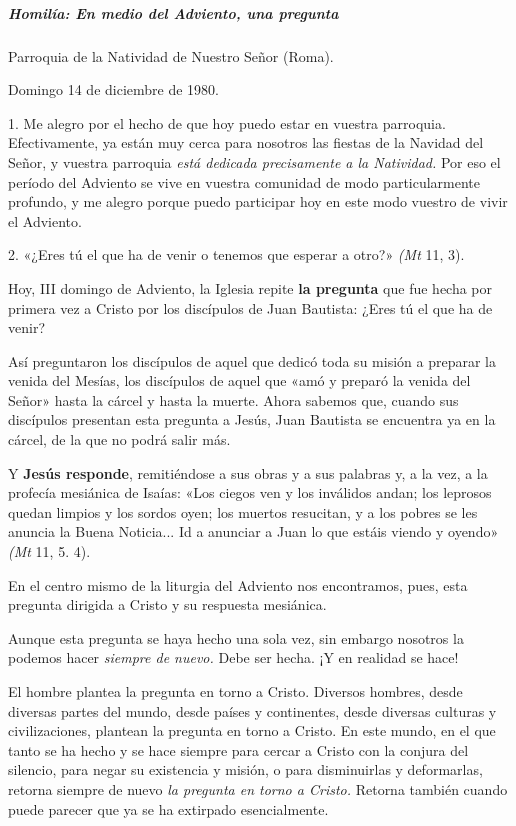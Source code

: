 \documentclass[]{article}
\let\oldsubparagraph\subparagraph
\renewcommand{\subparagraph}[1]{\oldsubparagraph{#1}\mbox{}}
\begin{document}
\subparagraph{Homilía: En medio del Adviento, una
pregunta}\label{homiluxeda-en-medio-del-adviento-una-pregunta}

Parroquia de la Natividad de Nuestro Señor (Roma).

Domingo 14 de diciembre de 1980.

1. Me alegro por el hecho de que hoy puedo estar en vuestra parroquia.
Efectivamente, ya están muy cerca para nosotros las fiestas de la
Navidad del Señor, y vuestra parroquia \emph{está dedicada precisamente
a la Natividad.} Por eso el período del Adviento se vive en vuestra
comunidad de modo particularmente profundo, y me alegro porque puedo
participar hoy en este modo vuestro de vivir el Adviento.

2. «¿Eres tú el que ha de venir o tenemos que esperar a otro?»
\emph{(Mt} 11, 3).

Hoy, III domingo de Adviento, la Iglesia repite \textbf{la pregunta} que
fue hecha por primera vez a Cristo por los discípulos de Juan Bautista:
¿Eres tú el que ha de venir?

Así preguntaron los discípulos de aquel que dedicó toda su misión a
preparar la venida del Mesías, los discípulos de aquel que «amó y
preparó la venida del Señor» hasta la cárcel y hasta la muerte. Ahora
sabemos que, cuando sus discípulos presentan esta pregunta a Jesús, Juan
Bautista se encuentra ya en la cárcel, de la que no podrá salir más.

Y \textbf{Jesús responde}, remitiéndose a sus obras y a sus palabras y,
a la vez, a la profecía mesiánica de Isaías: «Los ciegos ven y los
inválidos andan; los leprosos quedan limpios y los sordos oyen; los
muertos resucitan, y a los pobres se les anuncia la Buena Noticia... Id
a anunciar a Juan lo que estáis viendo y oyendo» \emph{(Mt} 11, 5. 4).

En el centro mismo de la liturgia del Adviento nos encontramos, pues,
esta pregunta dirigida a Cristo y su respuesta mesiánica.

Aunque esta pregunta se haya hecho una sola vez, sin embargo nosotros la
podemos hacer \emph{siempre de nuevo.} Debe ser hecha. ¡Y en realidad se
hace!

El hombre plantea la pregunta en torno a Cristo. Diversos hombres, desde
diversas partes del mundo, desde países y continentes, desde diversas
culturas y civilizaciones, plantean la pregunta en torno a Cristo. En
este mundo, en el que tanto se ha hecho y se hace siempre para cercar a
Cristo con la conjura del silencio, para negar su existencia y misión, o
para disminuirlas y deformarlas, retorna siempre de nuevo \emph{la
pregunta en torno a Cristo.} Retorna también cuando puede parecer que ya
se ha extirpado esencialmente.
\end{document}
